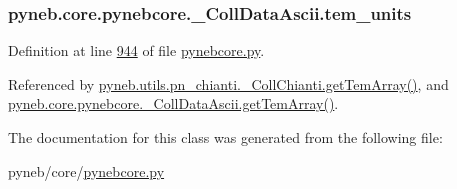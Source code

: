 \hypertarget{classpyneb_1_1core_1_1pynebcore_1_1___coll_data_ascii_ad026d62c0262a257b38f70a1d7b88c9b}{
\subsubsection[{tem\-\_\-units}]{\setlength{\rightskip}{0pt plus 5cm}pyneb.\-core.\-pynebcore.\-\_\-\-Coll\-Data\-Ascii.\-tem\-\_\-units}}\label{classpyneb_1_1core_1_1pynebcore_1_1___coll_data_ascii_ad026d62c0262a257b38f70a1d7b88c9b}


Definition at line \hyperlink{pynebcore_8py_source_l00944}{944} of file \hyperlink{pynebcore_8py_source}{pynebcore.\-py}.



Referenced by \hyperlink{pn__chianti_8py_source_l00551}{pyneb.\-utils.\-pn\-\_\-chianti.\-\_\-\-Coll\-Chianti.\-get\-Tem\-Array()}, and \hyperlink{pynebcore_8py_source_l01129}{pyneb.\-core.\-pynebcore.\-\_\-\-Coll\-Data\-Ascii.\-get\-Tem\-Array()}.



The documentation for this class was generated from the following file\-:\begin{DoxyCompactItemize}
\item 
pyneb/core/\hyperlink{pynebcore_8py}{pynebcore.\-py}\end{DoxyCompactItemize}
